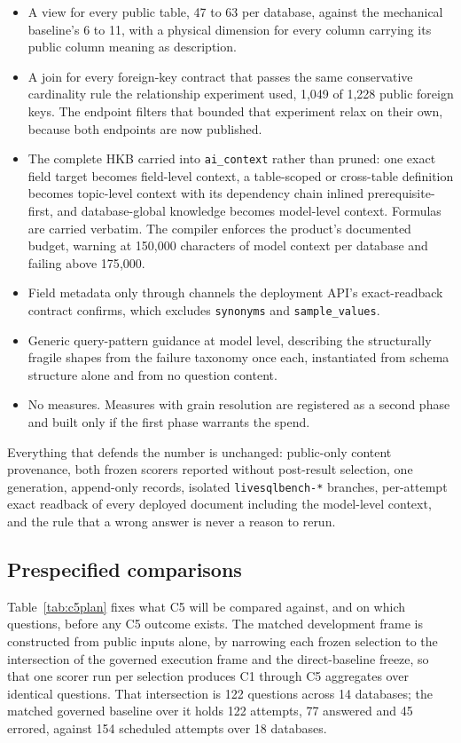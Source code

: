 \begin{itemize}
\item A view for every public table, 47 to 63 per database, against the
      mechanical baseline's 6 to 11, with a physical dimension for every column
      carrying its public column meaning as description.
\item A join for every foreign-key contract that passes the same conservative
      cardinality rule the relationship experiment used, 1,049 of 1,228 public
      foreign keys. The endpoint filters that bounded that experiment relax on
      their own, because both endpoints are now published.
\item The complete HKB carried into \texttt{ai\_context} rather than pruned: one
      exact field target becomes field-level context, a table-scoped or
      cross-table definition becomes topic-level context with its dependency
      chain inlined prerequisite-first, and database-global knowledge becomes
      model-level context. Formulas are carried verbatim. The compiler enforces
      the product's documented budget, warning at 150{,}000 characters of model
      context per database and failing above 175{,}000.
\item Field metadata only through channels the deployment API's exact-readback
      contract confirms, which excludes \texttt{synonyms} and
      \texttt{sample\_values}.
\item Generic query-pattern guidance at model level, describing the structurally
      fragile shapes from the failure taxonomy once each, instantiated from
      schema structure alone and from no question content.
\item No measures. Measures with grain resolution are registered as a second
      phase and built only if the first phase warrants the spend.
\end{itemize}

Everything that defends the number is unchanged: public-only content provenance,
both frozen scorers reported without post-result selection, one generation,
append-only records, isolated \texttt{livesqlbench-*} branches, per-attempt exact
readback of every deployed document including the model-level context, and the
rule that a wrong answer is never a reason to rerun.

\subsection{Prespecified comparisons}
Table~\ref{tab:c5plan} fixes what C5 will be compared against, and on which
questions, before any C5 outcome exists. The matched development frame is
constructed from public inputs alone, by narrowing each frozen selection to the
intersection of the governed execution frame and the direct-baseline freeze, so
that one scorer run per selection produces C1 through C5 aggregates over
identical questions. That intersection is 122 questions across 14 databases; the
matched governed baseline over it holds 122 attempts, 77 answered and 45 errored,
against 154 scheduled attempts over 18 databases.

